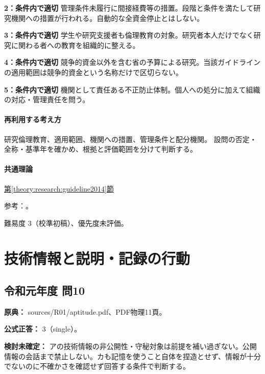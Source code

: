 \noindent\textbf{2：条件内で適切} 管理条件未履行に間接経費等の措置。段階と条件を満たして研究機関への措置が行われる。自動的な全資金停止とはしない。\par

\noindent\textbf{3：条件内で適切} 学生や研究支援者も倫理教育の対象。研究者本人だけでなく研究に関わる者への教育を組織的に整える。\par

\noindent\textbf{4：条件内で適切} 競争的資金以外を含む省の予算による研究。当該ガイドラインの適用範囲は競争的資金という名称だけで区切らない。\par

\noindent\textbf{5：条件内で適切} 機関として責任ある不正防止体制。個人への処分に加えて組織の対応・管理責任を問う。\par

\paragraph{再利用する考え方} 研究倫理教育、適用範囲、機関への措置、管理条件と配分機関。 設問の否定・全称・基準年を確かめ、根拠と評価範囲を分けて判断する。

\paragraph{共通理論} \hyperref[theory:research:guideline2014]{第\ref*{theory:research:guideline2014}節}

\par 参考：\cite{mext_misconduct2014}。

\par 難易度 3（校準初稿）、優先度未評価。

\section{技術情報と説明・記録の行動}

\subsection{令和元年度 問10}
\label{q:r01-reg-apt-10}

\noindent\textbf{原典：} sources/R01/aptitude.pdf、PDF物理11頁。

\textbf{公式正答：} 3（single）。

\par\textbf{検討未確定：} アの技術情報の非公開性・守秘対象は前提を補い過ぎない。公開情報の会話まで禁止しない。カも記憶を使うこと自体を捏造とせず、情報が十分でないのに不確かさを確認せず回答する条件で判断する。

